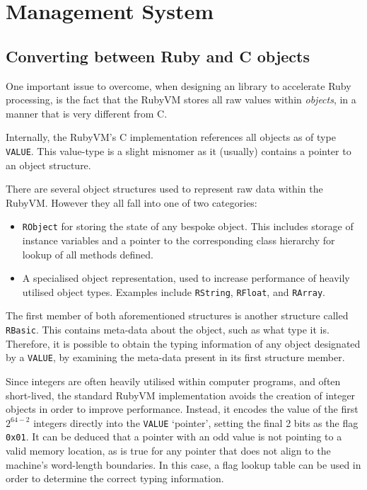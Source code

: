\section{Management System}

\subsection{Converting between Ruby and C objects}
One important issue to overcome, when designing an library to accelerate Ruby processing, is the fact that the RubyVM stores all raw values within \emph{objects}, in a manner that is very different from C.

Internally, the RubyVM's C implementation references all objects as of type \verb|VALUE|. This value-type is a slight misnomer as it (usually) contains a pointer to an object structure.

There are several object structures used to represent raw data within the RubyVM. However they all fall into one of two categories:
\begin{itemize}
     \item \verb|RObject| for storing the state of any bespoke object. This includes storage of instance variables and a pointer to the corresponding class hierarchy for lookup of all methods defined.
     \item A specialised object representation, used to increase performance of heavily utilised object types. Examples include \verb|RString|, \verb|RFloat|, and \verb|RArray|.
\end{itemize}

The first member of both aforementioned structures is another structure called \verb|RBasic|. This contains meta-data about the object, such as what type it is. Therefore, it is possible to obtain the typing information of any object designated by a \verb|VALUE|, by examining the meta-data present in its first structure member.

Since integers are often heavily utilised within computer programs, and often short-lived, the standard RubyVM implementation avoids the creation of integer objects in order to improve performance.
Instead, it encodes the value of the first $2^{64 - 2}$ integers directly into the \verb|VALUE| `pointer', setting the final 2 bits as the flag \verb|0x01|.
It can be deduced that a pointer with an odd value is not pointing to a valid memory location, as is true for any pointer that does not align to the machine's word-length boundaries. In this case, a flag lookup table can be used in order to determine the correct typing information.

